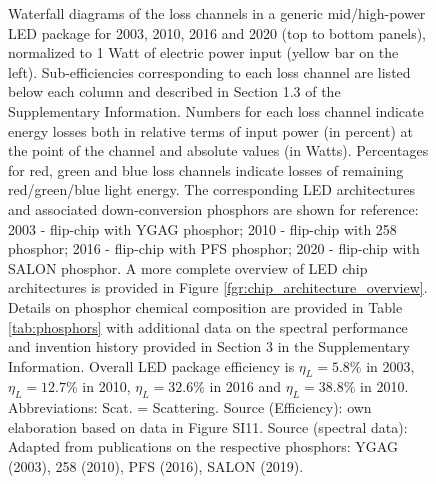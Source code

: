 \documentclass[journal=jacsat,manuscript=article]{achemso}
\begin{document}
\begin{figure}[h!]
 \caption{Waterfall diagrams of the loss channels in a generic mid/high-power LED package for 2003, 2010, 2016 and 2020 (top to bottom panels), normalized to 1 Watt of electric power input (yellow bar on the left). Sub-efficiencies corresponding to each loss channel are listed below each column and described in Section 1.3 of the Supplementary Information. Numbers for each loss channel indicate energy losses both in relative terms of input power (in percent) at the point of the channel and absolute values (in Watts). Percentages for red, green and blue loss channels indicate losses of remaining red/green/blue light energy. The corresponding LED architectures and associated down-conversion phosphors are shown for reference: 2003 - flip-chip with YGAG phosphor; 2010 - flip-chip with 258 phosphor; 2016 - flip-chip with PFS phosphor; 2020 - flip-chip with SALON phosphor. A more complete overview of LED chip architectures is provided in Figure \ref{fgr:chip_architecture_overview}. Details on phosphor chemical composition are provided in Table \ref{tab:phosphors} with additional data on the spectral performance and invention history provided in Section 3 in the Supplementary Information. Overall LED package efficiency is $\eta_L = 5.8\%$ in 2003, $\eta_L = 12.7\%$ in 2010, $\eta_L = 32.6\%$ in 2016 and $\eta_L = 38.8\%$ in 2010. Abbreviations: Scat. = Scattering. Source (Efficiency): own elaboration based on data in Figure SI11. Source (spectral data): Adapted from publications on the respective phosphors: YGAG (2003)\cite{Mueller2002}, 258 (2010)\cite{MuellerMach2005}, PFS (2016)\cite{Murphy2015}, SALON (2019)\cite{Hoerder2019}.}
 \label{fgr:waterfall}
\end{figure}
\end{document}
